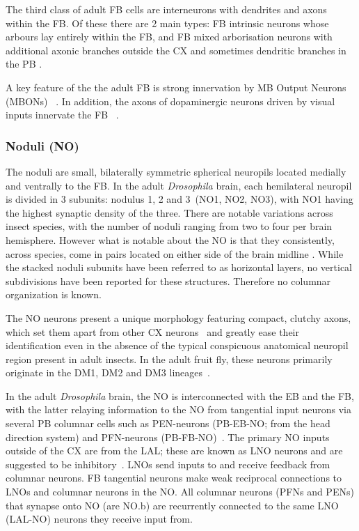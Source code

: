         The third class of adult FB cells are interneurons with dendrites and axons within the FB.
        Of these there are 2 main types: FB intrinsic neurons whose arbours lay entirely within the FB, and FB mixed arborisation neurons with additional axonic branches outside the CX and sometimes dendritic branches in the PB \citep{wolff2015neuroarchitecture}.

        A key feature of the the adult FB is strong innervation by MB Output Neurons (MBONs) ~\citep{scheffer2020connectome, hulse2021connectome}.
        In addition, the axons of dopaminergic neurons driven by visual inputs innervate the FB ~\citep{lin2013comprehensive}.
        \subsubsection{Noduli (NO)}
        The noduli are small, bilaterally symmetric spherical neuropils located medially and ventrally to the FB. In the adult \textit{Drosophila} brain, each hemilateral neuropil is divided in 3 subunits: nodulus 1, 2 and 3~(NO1, NO2, NO3), with NO1 having the highest synaptic density of the three. There are notable variations across insect species, with the number of noduli ranging from two to four per brain hemisphere. However what is notable about the NO is that they consistently, across species, come in pairs located on either side of the brain midline \citep{heinze2024variations}.
        While the stacked noduli subunits have been referred to as horizontal layers, no vertical subdivisions have been reported for these structures. Therefore no columnar organization is known.

        The NO neurons present a unique morphology featuring compact, clutchy axons, which set them apart from other CX neurons~\citep{wolff2018neuroarchitecture, hulse2021connectome} and greatly ease their identification even in the absence of the typical conspicuous anatomical neuropil region present in adult insects. In the adult fruit fly, these neurons primarily originate in the DM1, DM2 and DM3 lineages~\citep{andrade2019developmentally}.

        In the adult \textit{Drosophila} brain, the NO is interconnected with the EB and the FB, with the latter relaying information to the NO from tangential input neurons via several PB columnar cells such as PEN-neurons (PB-EB-NO; from the head direction system) and PFN-neurons (PB-FB-NO)~\citep{wolff2015neuroarchitecture, hulse2021connectome}.
        The primary NO inputs outside of the CX are from the LAL; these are known as LNO neurons and are suggested to be inhibitory~\citep{wolff2018neuroarchitecture, hulse2021connectome}.
        LNOs send inputs to and receive feedback from columnar neurons. %
        FB tangential neurons make weak reciprocal connections to LNOs and columnar neurons in the NO.
        All columnar neurons (PFNs and PENs) that synapse onto NO (are NO.b) are recurrently connected to the same LNO (LAL-NO) neurons they receive input from. 
